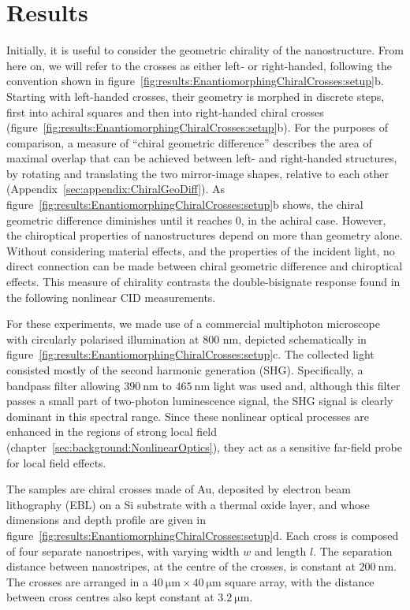 \section{Results}\label{sec:results:EnantiomorphingChiralCrosses:results}

Initially, it is useful to consider the geometric chirality of the nanostructure. From here on, we will refer to the crosses as either left- or right-handed, following the convention shown in figure~\ref{fig:results:EnantiomorphingChiralCrosses:setup}b. Starting with left-handed crosses, their geometry is morphed in discrete steps, first into achiral squares and then into right-handed chiral crosses (figure~\ref{fig:results:EnantiomorphingChiralCrosses:setup}b). 
For the purposes of comparison, a measure of ``chiral geometric difference'' describes the area of maximal overlap that can be achieved between left- and right-handed structures, by rotating and translating the two mirror-image shapes, relative to each other (Appendix~\ref{sec:appendix:ChiralGeoDiff}). 
As figure~\ref{fig:results:EnantiomorphingChiralCrosses:setup}b shows, the chiral geometric difference diminishes until it reaches 0, in the achiral case. However, the chiroptical properties of nanostructures depend on more than geometry alone. Without considering material effects, and the properties of the incident light, no direct connection can be made between chiral geometric difference and chiroptical effects. This measure of chirality contrasts the double-bisignate response found in the following nonlinear CID measurements.

For these experiments, we made use of a commercial multiphoton microscope with circularly polarised illumination at 800 nm, depicted schematically in figure~\ref{fig:results:EnantiomorphingChiralCrosses:setup}c. The collected light consisted mostly of the second harmonic generation (SHG). Specifically, a bandpass filter allowing $\SI{390}{\nano\m}$ to $\SI{465}{\nano\m}$ light was used and, although this filter passes a small part of two-photon luminescence signal, the SHG signal is clearly dominant in this spectral range. Since these nonlinear optical processes are enhanced in the regions of strong local field (chapter~\ref{sec:background:NonlinearOptics}), they act as a sensitive far-field probe for local field effects. 

The samples are chiral crosses made of Au, deposited by electron beam lithography (EBL) on a Si substrate with a thermal oxide layer, and whose dimensions and depth profile are given in figure~\ref{fig:results:EnantiomorphingChiralCrosses:setup}d. Each cross is composed of four separate nanostripes, with varying width $w$ and length $l$. The separation distance between nanostripes, at the centre of the crosses, is constant at $\SI{200}{\nano\m}$. The crosses are arranged in a $\SI{40}{\micro\m} \times \SI{40}{\micro\m}$ square array, with the distance between cross centres also kept constant at $\SI{3.2}{\micro\m}$. 


